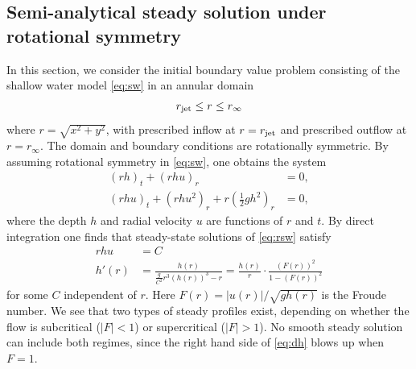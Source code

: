\documentclass[preprint, 11pt]{article}
\begin{document}
\subsection{Semi-analytical steady solution under rotational symmetry}\label{sec:steady_chj}
In this section, we consider the initial boundary value problem consisting of the
shallow water model \eqref{eq:sw} in an annular domain
\begin{align} \label{eq:annulus}
r_\textup{jet} \le r \le r_\infty
\end{align}
where $r = \sqrt{x^2+y^2}$, with prescribed inflow at $r=r_\textup{jet}$
and prescribed outflow at $r=r_\infty$.
The domain and boundary conditions are rotationally symmetric.
By assuming rotational symmetry in \eqref{eq:sw}, one obtains the system
\begin{subequations} \label{eq:rsw}
\begin{align}
    (rh)_t + (rhu)_r &= 0, \label{mass1} \\
    (rhu)_t + (rhu^2)_r + r \left(\frac{1}{2}gh^2\right)_r &= 0, \label{mom1}
\end{align}
\end{subequations}
where the depth $h$ and radial velocity $u$ are functions of $r$ and $t$.
By direct integration one finds that steady-state solutions of
\eqref{eq:rsw} satisfy
\begin{subequations}\label{steady}
\begin{align}
    rhu & = C \\
    h'(r) & = \frac{h(r)}{\frac{g}{C^2} r^3 (h(r))^3 -r} = \frac{h(r)}{r} \cdot \frac{(F(r))^2}{1-(F(r))^2} \label{eq:dh}
\end{align}
\end{subequations}
for some $C$ independent of $r$.  Here $F(r)=|u(r)|/\sqrt{gh(r)}$ is the Froude number.
We see that two types of steady profiles exist, depending on whether the flow
is subcritical ($|F|<1$) or supercritical ($|F|>1$).  No smooth steady solution can
include both regimes, since the right hand side of \eqref{eq:dh} blows up when $F=1$.
\end{document}
